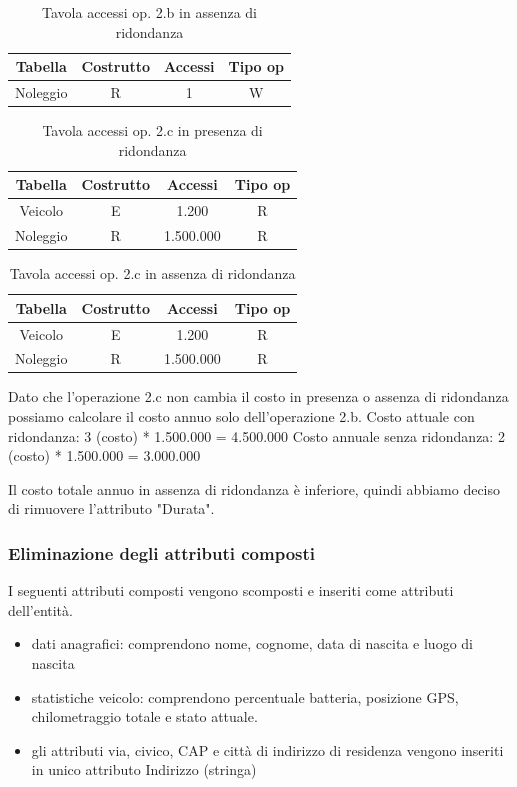 \documentclass{article}
\begin{document}
\begin{table}[H]
  \centering
  \begin{tabular}{|c|c|c|c|}
    \hline
    Tabella & Costrutto & Accessi & Tipo op \\ \hline
    Noleggio & R & 1 & W \\ \hline 
  \end{tabular}
  \caption{Tavola accessi op. 2.b in assenza di ridondanza}
\end{table}

\begin{table}[H]
  \centering
  \begin{tabular}{|c|c|c|c|}
    \hline
    Tabella & Costrutto & Accessi & Tipo op \\ \hline
    Veicolo & E & 1.200 & R  \\ \hline
    Noleggio & R & 1.500.000 & R \\ \hline
  \end{tabular}
  \caption{Tavola accessi op. 2.c in presenza di ridondanza}
\end{table}

\begin{table}[H]
  \centering
  \begin{tabular}{|c|c|c|c|}
    \hline
    Tabella & Costrutto & Accessi & Tipo op \\ \hline
    Veicolo & E & 1.200 & R  \\ \hline
    Noleggio & R & 1.500.000 & R \\ \hline
  \end{tabular}
  \caption{Tavola accessi op. 2.c in assenza di ridondanza}
\end{table}

Dato che l'operazione 2.c non cambia il costo in presenza o assenza di ridondanza possiamo calcolare il costo annuo solo dell'operazione 2.b.
Costo attuale con ridondanza: 3 (costo) * 1.500.000 = 4.500.000
Costo annuale senza ridondanza: 2 (costo) * 1.500.000 = 3.000.000

Il costo totale annuo in assenza di ridondanza è inferiore, quindi abbiamo deciso di rimuovere l'attributo "Durata".

\subsubsection{Eliminazione degli attributi composti}

I seguenti attributi composti vengono scomposti e inseriti come attributi dell'entità.
\begin{itemize}
    \item dati anagrafici: comprendono nome, cognome, data di nascita e luogo di nascita
    \item statistiche veicolo: comprendono percentuale batteria, posizione GPS, chilometraggio totale e stato attuale.
    \item gli attributi via, civico, CAP e città di indirizzo di residenza vengono inseriti in unico attributo Indirizzo (stringa)
\end{itemize}
\end{document}
